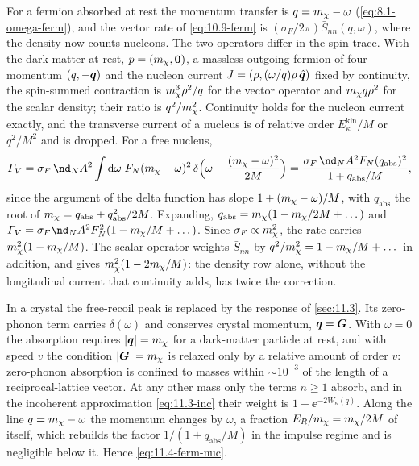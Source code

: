 For a fermion absorbed at rest the momentum transfer is $q = m_{\chi} - \omega$ (\cref{eq:8.1-omega-ferm}), and the vector rate of \cref{eq:10.9-ferm} is $(\sigma_F/2\pi)\bar S_{nn}(q,\omega)$, where the density now counts nucleons. The two operators differ in the spin trace. With the dark matter at rest, $p = (m_{\chi}, \bm{0})$, a massless outgoing fermion of four-momentum $(q, -\bm{q})$ and the nucleon current $J = (\rho, (\omega/q)\rho\,\hat{\bm{q}})$ fixed by continuity, the spin-summed contraction is $m_{\chi}^3\rho^2/q$ for the vector operator and $m_{\chi} q\rho^2$ for the scalar density; their ratio is $q^2/m_{\chi}^2$. Continuity holds for the nucleon current exactly, and the transverse current of a nucleus is of relative order $E^{\mathrm{kin}}_\kappa/M$ or $q^2/M^2$ and is dropped. For a free nucleus,
\begin{equation*}
  \varGamma_V = \sigma_F\,\nd_NA^2\int\dd\omega\;F_N(\mchi - \omega)^2\,\delta\Bigl(\omega - \frac{(\mchi - \omega)^2}{2M}\Bigr) = \frac{\sigma_F\,\nd_NA^2F_N(q_{\mathrm{abs}})^2}{1 + q_{\mathrm{abs}}/M} ,
\end{equation*}
since the argument of the delta function has slope $1 + (m_{\chi} - \omega)/M$, with $q_{\mathrm{abs}}$ the root of $m_{\chi} = q_{\mathrm{abs}} + q_{\mathrm{abs}}^2/2M$. Expanding, $q_{\mathrm{abs}} = m_{\chi}(1 - m_{\chi}/2M + \dots)$ and $\varGamma_V = \sigma_F\nd_NA^2F_N^2(1 - \mchi/M + \dots)$. Since $\sigma_F \propto m_{\chi}^2$, the rate carries $m_{\chi}^2(1 - m_{\chi}/M)$. The scalar operator weights $\bar S_{nn}$ by $q^2/m_{\chi}^2 = 1 - m_{\chi}/M + \dots$ in addition, and gives $m_{\chi}^2(1 - 2m_{\chi}/M)$: the density row alone, without the longitudinal current that continuity adds, has twice the correction.

In a crystal the free-recoil peak is replaced by the response of \cref{sec:11.3}. Its zero-phonon term carries $\delta(\omega)$ and conserves crystal momentum, $\bm{q} = \bm{G}$. With $\omega = 0$ the absorption requires $|\bm{q}| = m_{\chi}$ for a dark-matter particle at rest, and with speed $v$ the condition $|\bm{G}| = m_{\chi}$ is relaxed only by a relative amount of order $v$: zero-phonon absorption is confined to masses within $\sim10^{-3}$ of the length of a reciprocal-lattice vector. At any other mass only the terms $n \ge 1$ absorb, and in the incoherent approximation \cref{eq:11.3-inc} their weight is $1 - \ee^{-2W_\kappa(q)}$. Along the line $q = m_{\chi} - \omega$ the momentum changes by $\omega$, a fraction $E_R/m_{\chi} = m_{\chi}/2M$ of itself, which rebuilds the factor $1/(1 + q_{\mathrm{abs}}/M)$ in the impulse regime and is negligible below it. Hence \cref{eq:11.4-ferm-nuc}.
